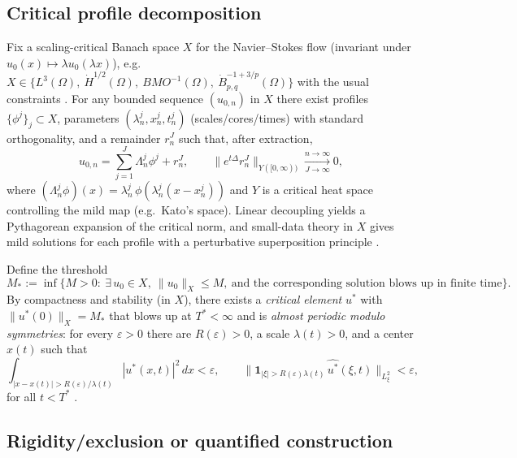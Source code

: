 \IfFileExists{nyjm.cls}{\documentclass[11pt]{nyjm}}{\documentclass[11pt]{amsart}}
\theoremstyle{plain}
\theoremstyle{definition}
\theoremstyle{remark}
\begin{document}
\subsection{Critical profile decomposition}\label{subsec:critical-profiles}
Fix a scaling-critical Banach space $X$ for the Navier–Stokes flow (invariant under $u_0(x)\mapsto\lambda u_0(\lambda x)$), e.g.\ $X\in\{L^3(\Omega),\ \dot H^{1/2}(\Omega),\ BMO^{-1}(\Omega),\ \dot B^{ -1+3/p }_{p,q}(\Omega)\}$ with the usual constraints \cite{Kato1984,KochTataru2001,LemarieRieusset2002}. For any bounded sequence $(u_{0,n})$ in $X$ there exist profiles $\{\phi^j\}_j\subset X$, parameters $(\lambda_n^j,x_n^j,t_n^j)$ (scales/cores/times) with standard orthogonality, and a remainder $r_n^J$ such that, after extraction,
\begin{equation}\label{eq:profile-decomp}
u_{0,n}=\sum_{j=1}^J \Lambda_n^j \phi^j + r_n^J,\qquad
\|e^{t\Delta}r_n^J\|_{Y([0,\infty))}\xrightarrow[J\to\infty]{n\to\infty}0,
\end{equation}
where $(\Lambda_n^j\phi)(x)=\lambda_n^j\,\phi(\lambda_n^j(x-x_n^j))$ and $Y$ is a critical heat space controlling the mild map (e.g.\ Kato’s space). Linear decoupling yields a Pythagorean expansion of the critical norm, and small-data theory in $X$ gives mild solutions for each profile with a perturbative superposition principle \cite{GallagherKochPlanchon2016}.

Define the threshold
\[
M_\ast:=\inf\Big\{M>0:\ \exists\,u_0\in X,\ \|u_0\|_X\le M,\ \text{and the corresponding solution blows up in finite time}\Big\}.
\]
By compactness and stability (in $X$), there exists a \emph{critical element} $u^\ast$ with $\|u^\ast(0)\|_X=M_\ast$ that blows up at $T^\ast<\infty$ and is \emph{almost periodic modulo symmetries}: for every $\varepsilon>0$ there are $R(\varepsilon)>0$, a scale $\lambda(t)>0$, and a center $x(t)$ such that
\[
\int_{|x-x(t)|>R(\varepsilon)/\lambda(t)} |u^\ast(x,t)|^2\,dx<\varepsilon,\qquad
\big\| \mathbf 1_{|\xi|>R(\varepsilon)\lambda(t)}\,\widehat{u^\ast}(\xi,t)\big\|_{L^2_\xi}<\varepsilon,
\]
for all $t<T^\ast$ \cite{KenigMerle2006,GallagherKochPlanchon2016,LemarieRieusset2002}.

\subsection{Rigidity/exclusion or quantified construction}\label{subsec:rigidity}
\end{document}
